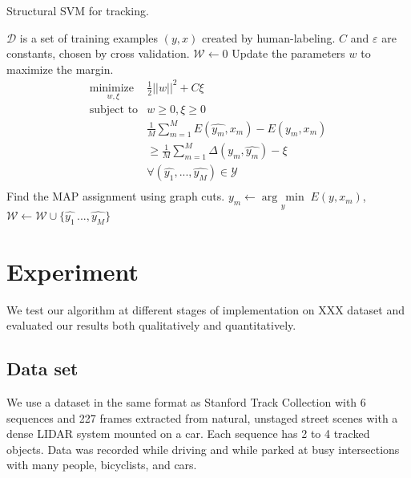 \documentclass[10pt,twocolumn,letterpaper]{article}
\newcommand{\minimize}[1]{\underset{#1}{\operatorname{minimize}\;}}
\newcommand{\argmin}[1]{\underset{#1}{\operatorname{arg}\,\operatorname{min}}\;}
\begin{document}
\begin{algorithm}
\caption{Structural SVM for tracking. } \label{algo_ssvm}
\begin{algorithmic}[1]
\STATE $\mathcal{D}$ is a set of training examples $(y,x)$ created by
human-labeling.
\STATE $C$ and $\varepsilon$ are constants, chosen by cross validation.
\STATE
\STATE $\mathcal{W} \gets 0$
\REPEAT
\STATE Update the parameters $w$ to maximize the margin.
\begin{equation}
\begin{array}{ll}
\minimize{w,\xi} & \frac{1}{2}||w||^2 + C\xi \\
\text{subject to} & w \ge 0, \xi \ge 0 \\
& \frac{1}{M}\sum_{m=1}^{M}E(\hat{y_m},x_m)-E(y_m, x_m) \\
& \ge \frac{1}{M}\sum_{m=1}^{M}\Delta(y_m, \hat{y_m}) - \xi \\
& \forall (\hat{y_1},...,\hat{y_M}) \in \mathcal{Y} \\
\end{array}
\end{equation}
\STATE Find the MAP assignment using graph cuts.
\STATE $\hat{y_m} \gets \argmin{y}E(y,x_m)$,
\ENDFOR
\STATE $\mathcal{W} \gets \mathcal{W} \cup \{\hat{y_1}\, ...,\hat{y_M}\} $
\end{algorithmic}
\end{algorithm}

\section{Experiment}
We test our algorithm at different stages of implementation on XXX dataset 
and evaluated our results both qualitatively and quantitatively.

\subsection{Data set}
We use a dataset in the same format as Stanford Track Collection with 6 sequences and 227 frames extracted from natural, unstaged street scenes
with a dense LIDAR system mounted on a car. Each sequence has 2 to 4 tracked objects. Data was recorded while driving and while parked at busy intersections with many people, bicyclists, and cars.
\end{document}
